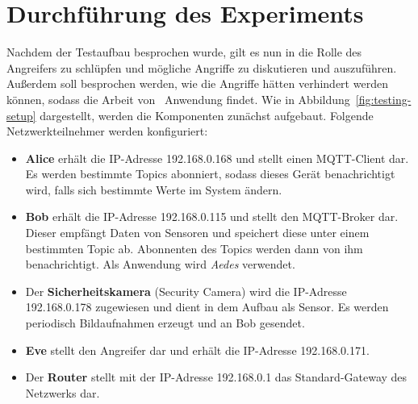\section{Durchführung des Experiments}
Nachdem der Testaufbau besprochen wurde, gilt es nun in die Rolle des Angreifers
zu schlüpfen und mögliche Angriffe zu diskutieren und auszuführen. Außerdem soll
besprochen werden, wie die Angriffe hätten verhindert werden können, sodass die
Arbeit von~\cite{paper} Anwendung findet. Wie in
Abbildung~\ref{fig:testing-setup} dargestellt, werden die Komponenten zunächst
aufgebaut. Folgende Netzwerkteilnehmer werden konfiguriert:

\begin{itemize}
  \item \textbf{Alice} erhält die IP-Adresse 192.168.0.168 und stellt einen
    MQTT-Client dar. Es werden bestimmte Topics abonniert, sodass dieses Gerät
    benachrichtigt wird, falls sich bestimmte Werte im System ändern.
  \item \textbf{Bob} erhält die IP-Adresse 192.168.0.115 und stellt den
    MQTT-Broker dar. Dieser empfängt Daten von Sensoren und speichert diese
    unter einem bestimmten Topic ab. Abonnenten des Topics werden dann von ihm
    benachrichtigt. Als Anwendung wird \textit{Aedes} verwendet.
  \item Der \textbf{Sicherheitskamera} (Security Camera) wird die IP-Adresse
    192.168.0.178 zugewiesen und dient in dem Aufbau als Sensor. Es werden
    periodisch Bildaufnahmen erzeugt und an Bob gesendet.
  \item \textbf{Eve} stellt den Angreifer dar und erhält die IP-Adresse
    192.168.0.171.
  \item Der \textbf{Router} stellt mit der IP-Adresse 192.168.0.1 das
    Standard-Gateway des Netzwerks dar.
\end{itemize}

